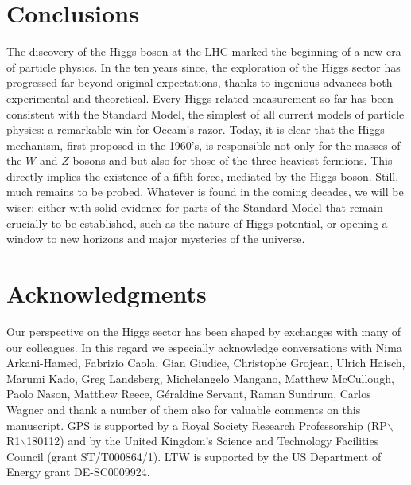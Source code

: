 \documentclass[12pt]{article}
\begin{document}
\section{Conclusions}

The discovery of the Higgs boson at the LHC marked the beginning of a
new era of particle physics.
%
In the ten years since, the exploration of the Higgs sector has
progressed far beyond original expectations, thanks to ingenious
advances both experimental and theoretical.
%
Every Higgs-related measurement so far has been consistent with the
Standard Model, the simplest of all current models of particle
physics: a remarkable win for Occam's razor. 
%
Today, it is clear that the Higgs mechanism, first proposed in the
1960's, is responsible not only for the masses of the $W$ and $Z$
bosons and but also for those of the three heaviest fermions.
%
This directly implies the existence of a fifth force, mediated by the
Higgs boson.
%
Still, much remains to be probed.
%
Whatever is found in the coming decades, we will be wiser: either with
solid evidence for parts of the Standard Model that remain crucially
to be established, such as the nature of Higgs potential, or opening a
window to new horizons and major mysteries of the universe.


\section{Acknowledgments}

Our perspective on the Higgs sector has been shaped by exchanges
with many of our colleagues.
%
In this regard we especially acknowledge conversations with
%
Nima Arkani-Hamed,    
Fabrizio Caola,       
Gian Giudice,         
Christophe Grojean,   
Ulrich Haisch,        
Marumi Kado,
Greg Landsberg,       
Michelangelo Mangano, 
Matthew McCullough,   
Paolo Nason,          
Matthew Reece,        
G\'eraldine Servant,  
Raman Sundrum,        
Carlos Wagner         
%
and thank a number of them also for valuable comments on this
manuscript.
%
GPS is supported by a Royal Society Research Professorship
(RP$\backslash$R1$\backslash$180112) and by the United Kingdom's
Science and Technology Facilities Council (grant ST/T000864/1).
%
LTW is supported by the US Department of Energy grant DE-SC0009924.


{}

\end{document}
